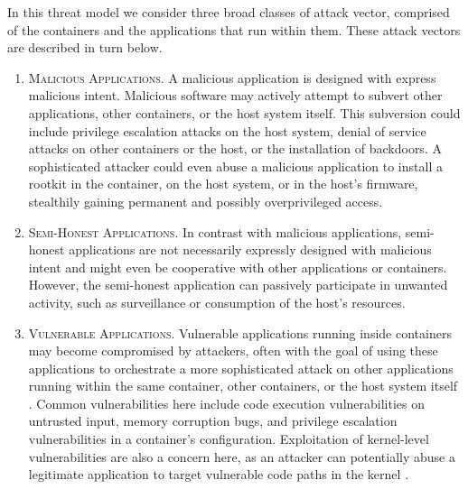 In this threat model we consider three broad classes of attack vector, comprised of the containers and the applications that run within them. These attack vectors are described in turn below.
\begin{enumerate}[label=\bfseries AV\arabic*., ref=AV\arabic*, labelindent=1em]
  \item \textsc{Malicious Applications.}
    A malicious application is designed with express malicious intent. Malicious software may actively attempt to subvert other applications, other containers, or the host system itself. This subversion could include privilege escalation attacks on the host system, denial of service attacks on other containers or the host, or the installation of backdoors. A sophisticated attacker could even abuse a malicious application to install a rootkit \cite{beegle2007_rootkit} in the container, on the host system, or in the host's firmware, stealthily gaining permanent and possibly overprivileged access.
  \item \textsc{Semi-Honest Applications.}
    In contrast with malicious applications, semi-honest applications are not necessarily expressly designed with malicious intent and might even be cooperative with other applications or containers. However, the semi-honest application can passively participate in unwanted activity, such as surveillance or consumption of the host's resources.
  \item \textsc{Vulnerable Applications.}
    Vulnerable applications running inside containers may become compromised by attackers, often with the goal of using these applications to orchestrate a more sophisticated attack on other applications running within the same container, other containers, or the host system itself \cite{sultan2019_container_security}. Common vulnerabilities here include code execution vulnerabilities on untrusted input, memory corruption bugs, and privilege escalation vulnerabilities in a container's configuration. Exploitation of kernel-level vulnerabilities are also a concern here, as an attacker can potentially abuse a legitimate application to target vulnerable code paths in the kernel \cite{xin2018_container_security}.
\end{enumerate}

